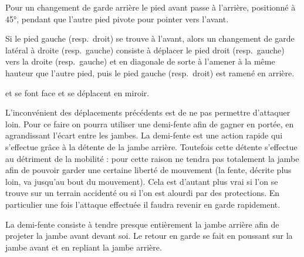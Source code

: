 \begin{definition}

Pour un changement de garde arrière le pied avant passe à l'arrière, positionné à 45°, pendant que l'autre pied pivote pour pointer vers l'avant.
\end{definition}


\begin{definition}

Si le pied gauche (resp.\ droit) se trouve à l'avant, alors un changement de garde latéral à droite (resp.\ gauche) consiste à déplacer le pied droit (resp.\ gauche) vers la droite (resp.\ gauche) et en diagonale de sorte à l'amener à la même hauteur que l'autre pied, puis le pied gauche (resp.\ droit) est ramené en arrière.
\end{definition}


\begin{exercice}
\label{ex:general:miroir}


\A et \D se font face et se déplacent en miroir.
\end{exercice}


L'inconvénient des déplacements précédents est de ne pas permettre d'attaquer loin.
Pour ce faire on pourra utiliser une demi-fente afin de gagner en portée, en agrandissant l'écart entre les jambes.
La demi-fente est une action rapide qui s'effectue grâce à la détente de la jambe arrière.
Toutefois cette détente s'effectue au détriment de la mobilité : pour cette raison ne tendra pas totalement la jambe afin de pouvoir garder une certaine liberté de mouvement (la fente, décrite plus loin, va jusqu'au bout du mouvement).
Cela est d'autant plus vrai si l'on se trouve sur un terrain accidenté ou si l'on est alourdi par des protections.
En particulier une fois l'attaque effectuée il faudra revenir en garde rapidement.

\begin{definition}
\label{dep:def:demi-fente}

La demi-fente consiste à tendre presque entièrement la jambe arrière afin de projeter la jambe avant devant soi.
Le retour en garde se fait en poussant sur la jambe avant et en repliant la jambe arrière.
\end{definition}



